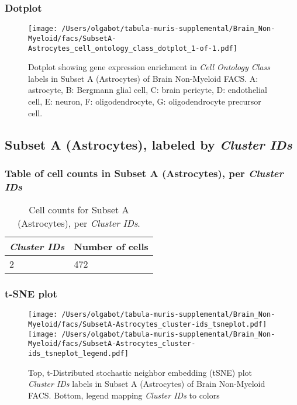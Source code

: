 \clearpage

\subsubsection{Dotplot}
\begin{figure}[h]
\centering
\texttt{[image: /Users/olgabot/tabula-muris-supplemental/Brain\_Non-Myeloid/facs/SubsetA-Astrocytes\_cell\_ontology\_class\_dotplot\_1-of-1.pdf]}

\caption{ Dotplot  showing gene expression enrichment in \emph{Cell Ontology Class} labels in Subset A (Astrocytes) of Brain Non-Myeloid FACS. A: astrocyte, B: Bergmann glial cell, C: brain pericyte, D: endothelial cell, E: neuron, F: oligodendrocyte, G: oligodendrocyte precursor cell.}
\end{figure}


\clearpage

\subsection{Subset A (Astrocytes), labeled by \emph{Cluster IDs}}
\subsubsection{Table of cell counts in Subset A (Astrocytes), per \emph{Cluster IDs}}\begin{table}[h]
\centering
\label{my-label}
\begin{tabular}{@{}ll@{}}
\toprule

\emph{Cluster IDs}& Number of cells \\ \midrule
2 & 472 \\
\bottomrule
\end{tabular}
\caption{Cell counts for Subset A (Astrocytes), per \emph{Cluster IDs}.}
\end{table}

\clearpage
\subsubsection{t-SNE plot}
\begin{figure}[h]
\centering
\texttt{[image: /Users/olgabot/tabula-muris-supplemental/Brain\_Non-Myeloid/facs/SubsetA-Astrocytes\_cluster-ids\_tsneplot.pdf]}
\texttt{[image: /Users/olgabot/tabula-muris-supplemental/Brain\_Non-Myeloid/facs/SubsetA-Astrocytes\_cluster-ids\_tsneplot\_legend.pdf]}
\caption{Top, t-Distributed stochastic neighbor embedding (tSNE) plot  \emph{Cluster IDs} labels in Subset A (Astrocytes) of Brain Non-Myeloid FACS. Bottom, legend mapping \emph{Cluster IDs} to colors}
\end{figure}


